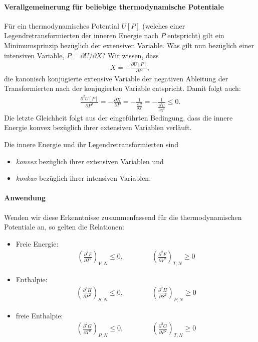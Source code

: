 \paragraph*{Verallgemeinerung für beliebige thermodynamische Potentiale}
Für ein thermodynamisches Potential $U\left[P\right]$ (welches einer Legendretransformierten der inneren Energie nach $P$ entspricht) gilt ein Minimumsprinzip bezüglich der extensiven Variable.
Was gilt nun bezüglich einer intensiven Variable, $P=\partial U/\partial X$?
Wir wissen, dass 
\begin{align*}
	X=-\frac{\partial U\left[P\right]}{\partial P},
\end{align*}
die kanonisch konjugierte extensive Variable der negativen Ableitung der Transformierten nach der konjugierten Variable entspricht.
Damit folgt auch:
\begin{align*}
	\frac{\partial^2 U\left[P\right]}{\partial P^2}=-\frac{\partial X}{\partial P}=-\frac{1}{\frac{\partial P}{\partial X}}=-\frac{1}{\frac{\partial^2 U}{\partial X^2}}\leq 0.
\end{align*}
Die letzte Gleichheit folgt aus der eingeführten Bedingung, dass die innere Energie konvex bezüglich ihrer extensiven Variablen verläuft.
\begin{formal}
	Die innere Energie und ihr Legendretransformierten sind 
	\begin{itemize}
		\item \emph{konvex} bezüglich ihrer extensiven Variablen und
		\item \emph{konkav} bezüglich ihrer intensiven Variablen.
	\end{itemize}
\end{formal}
\paragraph*{Anwendung}
Wenden wir diese Erkenntnisse zusammenfassend für die thermodynamischen Potentiale an, so gelten die Relationen:
\begin{itemize}
	\item Freie Energie: 
	\begin{align*}
		\left(\frac{\partial ^2F}{\partial T^2}\right)_{V,N}\leq 0,\qquad\qquad \left(\frac{\partial^2F}{\partial V^2}\right)_{T,N}\geq 0
	\end{align*}
	\item Enthalpie: 
	\begin{align*}
		\left(\frac{\partial ^2H}{\partial P^2}\right)_{S,N}\leq 0,\qquad\qquad \left(\frac{\partial^2H}{\partial S^2}\right)_{P,N}\geq 0
	\end{align*}
	\item freie Enthalpie: 
	\begin{align*}
		\left(\frac{\partial ^2G}{\partial T^2}\right)_{P,N}\leq 0,\qquad\qquad \left(\frac{\partial^2G}{\partial P^2}\right)_{T,N}\geq 0
	\end{align*}	
\end{itemize}


